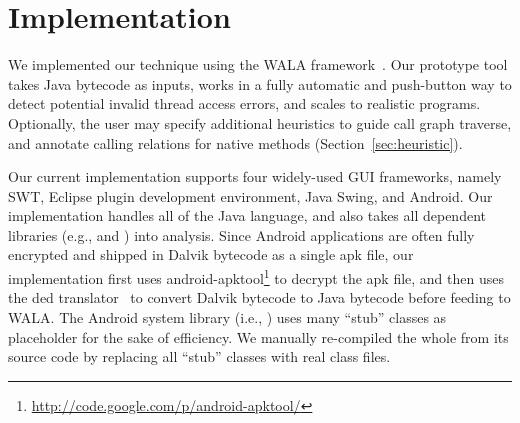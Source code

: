 \section{Implementation}
\label{sec:implementation}

We implemented our technique using the WALA framework~\cite{walatutorial}.
Our prototype tool takes Java bytecode as inputs, works in a fully
automatic and push-button way to detect potential invalid thread access
errors, and scales to realistic programs.  
Optionally, the user may specify additional heuristics to guide call graph
traverse, and annotate calling relations for native methods (Section~\ref{sec:heuristic}).

Our current implementation supports four widely-used GUI frameworks, namely
SWT, Eclipse plugin development environment, Java Swing, and Android.
Our implementation handles all of the Java language, and also takes
all dependent libraries (e.g.,  and )
into analysis. Since Android applications are often fully encrypted and shipped in Dalvik
bytecode as a single apk file, our implementation first uses
android-apktool\footnote{\url{http://code.google.com/p/android-apktool/}} to
decrypt the apk file, and then uses the 
ded translator~\cite{Enck:2011:SAA:2028067.2028088} to convert
Dalvik bytecode to Java bytecode before feeding to WALA.  The Android system
library (i.e., ) uses many ``stub'' classes as
placeholder for the sake of efficiency. We manually re-compiled the whole
 from its source code by replacing all ``stub'' classes
with real class files.

